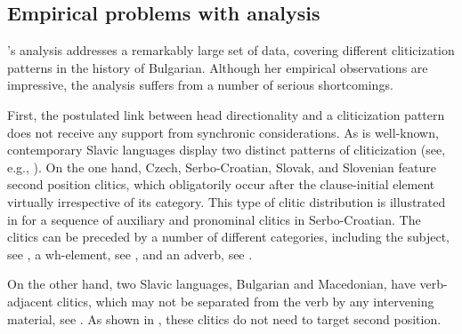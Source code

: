 \documentclass[output=paper,
modfonts,
newtxmath,
hidelinks
]{langscibook}
\begin{document}
\subsection{Empirical problems with  analysis}\label{11:s2.2}

\citeauthor{pancheva2005}’s analysis addresses a remarkably large set of data, covering different cliticization patterns in the history of Bulgarian. Although her empirical observations are impressive, the analysis suffers from a number of serious shortcomings. 

First, the postulated link between head directionality and a cliticization pattern does not receive any support from synchronic considerations. As is well-known, contemporary Slavic languages display two distinct patterns of cliticization (see, e.g., \citealt{Franks-King2000}). On the one hand, Czech, Serbo-Croatian, Slovak, and Slovenian feature second position clitics, which obligatorily occur after the clause-initial element virtually irrespective of its category. This type of clitic distribution is illustrated in  for a sequence of auxiliary and pronominal clitics in Serbo-Croatian. The clitics can be preceded by a number of different categories, including the subject, see , a wh-element, see , and an adverb, see . 

\ea \label{11:ex6}
	 \label{11:ex6a}
    \label{11:ex6b}
    \label{11:ex6c}
	\z
\z
On the other hand, two Slavic languages, Bulgarian and Macedonian, have verb-adjacent clitics, which may not be separated from the verb by any intervening material, see . As shown in , these clitics do not need to target second position. 
\end{document}
